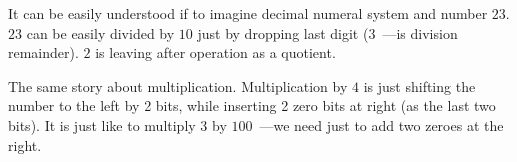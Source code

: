 \label{division_by_shifting}
{It can be easily understood if to imagine decimal numeral system and number $23$.
$23$ can be easily divided by $10$ just by dropping last digit ($3$~---is division remainder). 
$2$ is leaving after operation as a \gls{quotient}.}

{The same story about multiplication.
Multiplication by $4$ is just shifting the number to the left by 2 bits,
while inserting 2 zero bits at right (as the last two bits).
It is just like to multiply $3$ by $100$~---we need just to add two zeroes at the right.}


